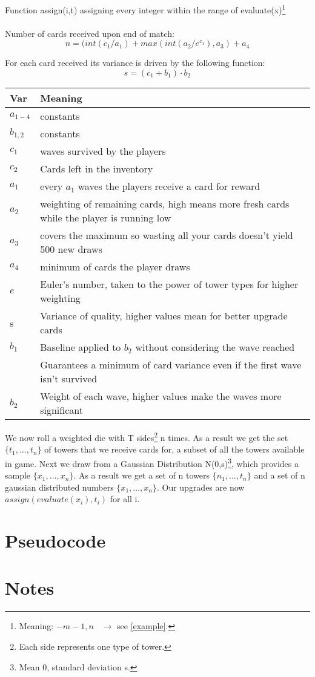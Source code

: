 \documentclass{scrartcl}
\begin{document}
Function assign(i,t) assigning every integer within the range of evaluate(x)\footnote{Meaning: $-m-1, n \;\;\; \rightarrow$ see \ref{example}.}\\ \\ 

Number of cards received upon end of match: 
$$ n = (int(c_1/a_1)+max(int(a_2/e^{c_1}),a_3)+a_4$$

For each card received its variance is driven by the following function:
$$s = (c_1 + b_1)\cdot b_2$$


\begin{tabular}{l|l}
Var & Meaning\\
\hline
$a_{1-4}$ & constants\\
$b_{1,2}$ & constants\\
$c_1$ & waves survived by the players\\
$c_2$ & Cards left in the inventory\\
$a_1$ & every $a_1$ waves the players receive a card for reward\\
$a_2$ & weighting of remaining cards, high means more fresh cards while the player is running low\\
$a_3$ & covers the maximum so wasting all your cards doesn't yield 500 new draws\\
$a_4$ & minimum of cards the player draws\\
$e$ 	& Euler's number, taken to the power of tower types for higher weighting\\
\hline
s	& Variance of quality, higher values mean for better upgrade cards\\
$b_1$ & Baseline applied to $b_2$ without considering the wave reached\\
& Guarantees a minimum of card variance even if the first wave isn't survived\\
$b_2$ & Weight of each wave, higher values make the waves more significant\\
\end{tabular}

We now roll a weighted die with T sides\footnote{Each side represents one type of tower.} n times. As a result we get the set $\{t_1,\ldots , t_n\}$ of towers that we receive cards for, a subset of all the towers available in game. Next we draw from a Gaussian Distribution N(0,s)\footnote{Mean 0, standard deviation s.}, which provides a sample $\{x_1,\ldots , x_n\}.$ As a result we get a set of n towers $\{n_1,\ldots ,t_n\}$ and a set of n gaussian distributed numbers $\{x_1, \ldots , x_n\}$. Our upgrades are now $assign(evaluate(x_i),t_i)$ for all i.

\section{Pseudocode}



\section{Notes}
\end{document}
